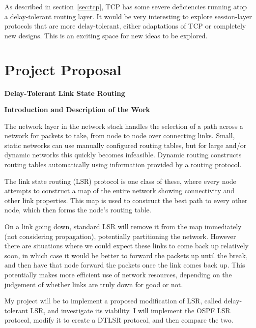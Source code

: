 \documentclass[withindex,glossary,openany]{cam-thesis}
\begin{document}
As described in section~\ref{sec:tcp}, TCP has some severe deficiencies running atop a delay-tolerant routing layer. It would be very interesting to explore session-layer protocols that are more delay-tolerant, either adaptations of TCP or completely new designs. This is an exciting space for new ideas to be explored.





\appendix
{}

\chapter{Project Proposal}

\vspace{-8mm}
\Huge\textbf{Delay-Tolerant Link State Routing}

\vspace{8mm}
\LARGE\textbf{Introduction and Description of the Work}\normalsize

The network layer in the network stack handles the selection of a path across a network for packets to take, from node to node over connecting links. Small, static networks can use manually configured routing tables, but for large and/or dynamic networks this quickly becomes infeasible. Dynamic routing constructs routing tables automatically using information provided by a routing protocol.

The link state routing (LSR) protocol is one class of these, where every node attempts to construct a map of the entire network showing connectivity and other link properties. This map is used to construct the best path to every other node, which then forms the node’s routing table.

On a link going down, standard LSR will remove it from the map immediately (not considering propagation), potentially partitioning the network. However there are situations where we could expect these links to come back up relatively soon, in which case it would be better to forward the packets up until the break, and then have that node forward the packets once the link comes back up. This potentially makes more efficient use of network resources, depending on the judgement of whether links are truly down for good or not.

My project will be to implement a proposed modification of LSR, called delay-tolerant LSR, and investigate its viability. I will implement the OSPF LSR protocol, modify it to create a DTLSR protocol, and then compare the two.
\end{document}
